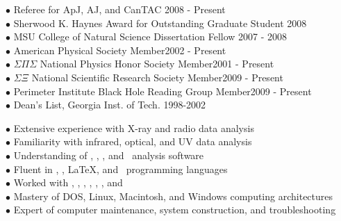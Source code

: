 \documentclass[12pt]{cv}
\begin{document}
\begin{llist}

$\bullet$ Referee for ApJ, AJ, and CanTAC \hfill 2008 - Present\\
$\bullet$ Sherwood K. Haynes Award for Outstanding Graduate Student \hfill 2008\\
$\bullet$ MSU College of Natural Science Dissertation Fellow \hfill 2007 - 2008\\
$\bullet$ American Physical Society Member\hfill 2002 - Present\\
$\bullet$ $\Sigma \Pi \Sigma$ National Physics Honor Society Member\hfill 2001 - Present\\
$\bullet$ $\Sigma \Xi$ National Scientific Research Society Member\hfill 2009 - Present\\
$\bullet$ Perimeter Institute Black Hole Reading Group Member\hfill 2009 - Present\\
$\bullet$ Dean's List, Georgia Inst. of Tech. \hfill 1998-2002


$\bullet$ Extensive experience with X-ray and radio data analysis\\
$\bullet$ Familiarity with infrared, optical, and UV data analysis\\
$\bullet$ Understanding of \aips, \casa, \ciao, and \iraf\ analysis software\\
$\bullet$ Fluent in \html, \idl, \LaTeX, and \perl\ programming languages\\
$\bullet$ Worked with \clang, \flash, \fortran, \mysql, \python, \supmo, and \tcl\\
$\bullet$ Mastery of DOS, Linux, Macintosh, and Windows computing architectures\\
$\bullet$ Expert of computer maintenance, system construction, and troubleshooting



\end{llist}
\end{document}
